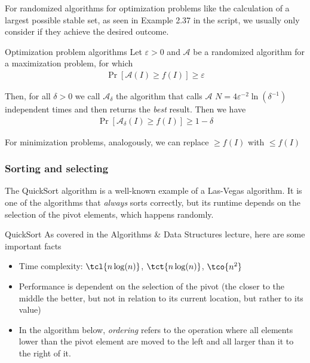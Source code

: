 For randomized algorithms for optimization problems like the calculation of a largest possible stable set, as seen in Example 2.37 in the script, we usually only consider if they achieve the desired outcome.

\begin{theorem}[]{Optimization problem algorithms}
    Let $\varepsilon > 0$ and $\mathcal{A}$ be a randomized algorithm for a maximization problem, for which
    \begin{align*}
        \Pr[\mathcal{A}(I) \geq f(I)] \geq \varepsilon
    \end{align*}

    Then, for all $\delta > 0$ we call $\mathcal{A}_{\delta}$ the algorithm that calls $\mathcal{A}$ $N = 4 \varepsilon^{-2} \ln(\delta^{-1})$ independent times and then returns the \textit{best} result. Then we have
    \begin{align*}
        \Pr[\mathcal{A}_{\delta}(I) \geq f(I)] \geq 1 - \delta
    \end{align*}
\end{theorem}
For minimization problems, analogously, we can replace $\geq f(I)$ with $\leq f(I)$


\subsubsection{Sorting and selecting}
The QuickSort algorithm is a well-known example of a Las-Vegas algorithm. It is one of the algorithms that \textit{always} sorts correctly, but its runtime depends on the selection of the pivot elements, which happens randomly.

\begin{recall}[]{QuickSort}
    As covered in the Algorithms \& Data Structures lecture, here are some important facts
    \begin{itemize}
        \item Time complexity: $\tcl{n \log(n)}$, $\tct{n \log(n)}$, $\tco{n^2}$
        \item Performance is dependent on the selection of the pivot (the closer to the middle the better, but not in relation to its current location, but rather to its value)
        \item In the algorithm below, \textit{ordering} refers to the operation where all elements lower than the pivot element are moved to the left and all larger than it to the right of it.
    \end{itemize}
\end{recall}

